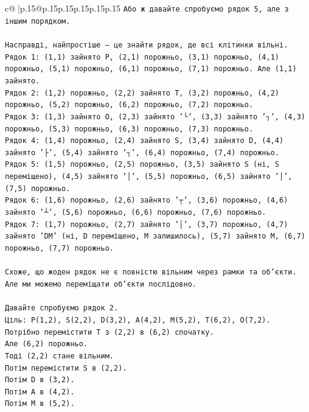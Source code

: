 \documentclass{article}
\begin{document}
{\begin{supertabular}{c@{$\;$}|p{.15\linewidth}@{}p{.15\linewidth}p{.15\linewidth}p{.15\linewidth}p{.15\linewidth}p{.15\linewidth}}
{{{\texttt{Або ж давайте спробуємо рядок 5, але з іншим порядком.} \\
\\ 
\texttt{Насправді, найпростіше — це знайти рядок, де всі клітинки вільні.} \\
\texttt{Рядок 1: (1,1) зайнято P, (2,1) порожньо, (3,1) порожньо, (4,1) порожньо, (5,1) порожньо, (6,1) порожньо, (7,1) порожньо. Але (1,1) зайнято.} \\
\texttt{Рядок 2: (1,2) порожньо, (2,2) зайнято T, (3,2) порожньо, (4,2) порожньо, (5,2) порожньо, (6,2) порожньо, (7,2) порожньо.} \\
\texttt{Рядок 3: (1,3) зайнято O, (2,3) зайнято '└', (3,3) зайнято '┐', (4,3) порожньо, (5,3) порожньо, (6,3) порожньо, (7,3) порожньо.} \\
\texttt{Рядок 4: (1,4) порожньо, (2,4) зайнято S, (3,4) зайнято D, (4,4) зайнято '├', (5,4) зайнято '┐', (6,4) порожньо, (7,4) порожньо.} \\
\texttt{Рядок 5: (1,5) порожньо, (2,5) порожньо, (3,5) зайнято S (ні, S переміщено), (4,5) зайнято '│', (5,5) порожньо, (6,5) зайнято '│', (7,5) порожньо.} \\
\texttt{Рядок 6: (1,6) порожньо, (2,6) зайнято '┬', (3,6) порожньо, (4,6) зайнято '┴', (5,6) порожньо, (6,6) порожньо, (7,6) порожньо.} \\
\texttt{Рядок 7: (1,7) порожньо, (2,7) зайнято '│', (3,7) порожньо, (4,7) зайнято 'DM' (ні, D переміщено, M залишилось), (5,7) зайнято M, (6,7) порожньо, (7,7) порожньо.} \\
\\ 
\texttt{Схоже, що жоден рядок не є повністю вільним через рамки та об'єкти.} \\
\texttt{Але ми можемо переміщати об'єкти послідовно.} \\
\\ 
\texttt{Давайте спробуємо рядок 2.} \\
\texttt{Ціль: P(1,2), S(2,2), D(3,2), A(4,2), M(5,2), T(6,2), O(7,2).} \\
\texttt{Потрібно перемістити T з (2,2) в (6,2) спочатку.} \\
\texttt{Але (6,2) порожньо.} \\
\texttt{Тоді (2,2) стане вільним.} \\
\texttt{Потім перемістити S в (2,2).} \\
\texttt{Потім D в (3,2).} \\
\texttt{Потім A в (4,2).} \\
\texttt{Потім M в (5,2).} \\
}}}
\end{supertabular}}
\end{document}
